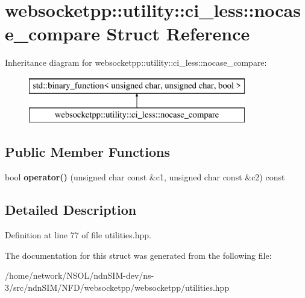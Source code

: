 \hypertarget{structwebsocketpp_1_1utility_1_1ci__less_1_1nocase__compare}{}\section{websocketpp\+:\+:utility\+:\+:ci\+\_\+less\+:\+:nocase\+\_\+compare Struct Reference}
\label{structwebsocketpp_1_1utility_1_1ci__less_1_1nocase__compare}
Inheritance diagram for websocketpp\+:\+:utility\+:\+:ci\+\_\+less\+:\+:nocase\+\_\+compare\+:\begin{figure}[H]
\begin{center}
\leavevmode
\includegraphics[height=2.000000cm]{structwebsocketpp_1_1utility_1_1ci__less_1_1nocase__compare}
\end{center}
\end{figure}
\subsection*{Public Member Functions}
\begin{DoxyCompactItemize}
\item 
bool {\bfseries operator()} (unsigned char const \&c1, unsigned char const \&c2) const\hypertarget{structwebsocketpp_1_1utility_1_1ci__less_1_1nocase__compare_a789eafdd3632c19b563ffb572eb45adc}{}\label{structwebsocketpp_1_1utility_1_1ci__less_1_1nocase__compare_a789eafdd3632c19b563ffb572eb45adc}

\end{DoxyCompactItemize}


\subsection{Detailed Description}


Definition at line 77 of file utilities.\+hpp.



The documentation for this struct was generated from the following file\+:\begin{DoxyCompactItemize}
\item 
/home/network/\+N\+S\+O\+L/ndn\+S\+I\+M-\/dev/ns-\/3/src/ndn\+S\+I\+M/\+N\+F\+D/websocketpp/websocketpp/utilities.\+hpp\end{DoxyCompactItemize}
